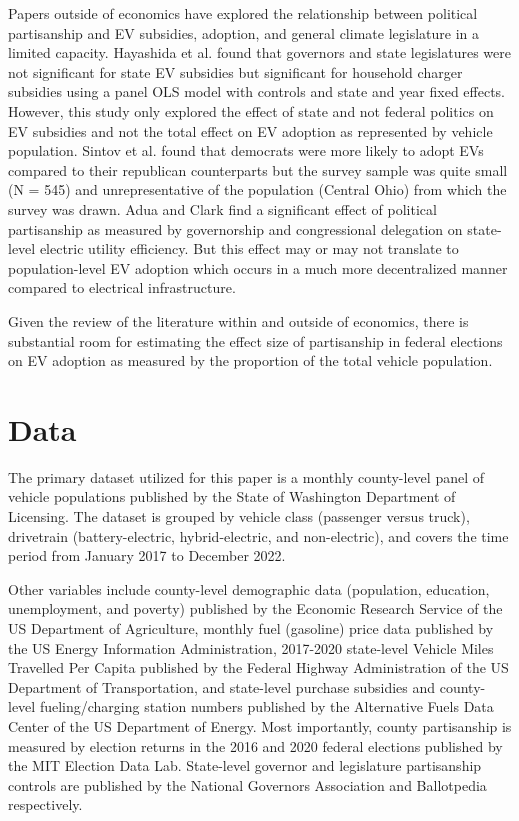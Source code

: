 \documentclass{article}
\begin{document}
Papers outside of economics have explored the relationship between political partisanship and EV subsidies, adoption, and general climate legislature in a limited capacity. Hayashida et al. found that governors and state legislatures were not significant for state EV subsidies but significant for household charger subsidies using a panel OLS model with controls and state and year fixed effects. \autocite{HAYASHIDA2021211} However, this study only explored the effect of state and not federal politics on EV subsidies and not the total effect on EV adoption as represented by vehicle population. Sintov et al. found that democrats were more likely to adopt EVs compared to their republican counterparts but the survey sample was quite small (N = 545) and unrepresentative of the population (Central Ohio) from which the survey was drawn. \autocite{SINTOV2020101576} Adua and Clark find a significant effect of political partisanship as measured by governorship and congressional delegation on state-level electric utility efficiency. \autocite{adua_clark_2020} But this effect may or may not translate to population-level EV adoption which occurs in a much more decentralized manner compared to electrical infrastructure. 

Given the review of the literature within and outside of economics, there is substantial room for estimating the effect size of partisanship in federal elections on EV adoption as measured by the proportion of the total vehicle population. 

\section{Data}

The primary dataset utilized for this paper is a monthly county-level panel of vehicle populations published by the State of Washington Department of Licensing. The dataset is grouped by vehicle class (passenger versus truck), drivetrain (battery-electric, hybrid-electric, and non-electric), and covers the time period from January 2017 to December 2022. 

Other variables include county-level demographic data (population, education, unemployment, and poverty) published by the Economic Research Service of the US Department of Agriculture, monthly fuel (gasoline) price data published by the US Energy Information Administration, 2017-2020 state-level Vehicle Miles Travelled Per Capita published by the Federal Highway Administration of the US Department of Transportation, and state-level purchase subsidies and county-level fueling/charging station numbers published by the Alternative Fuels Data Center of the US Department of Energy. Most importantly, county partisanship is measured by election returns in the 2016 and 2020 federal elections published by the MIT Election Data Lab. State-level governor and legislature partisanship controls are published by the National Governors Association and Ballotpedia respectively. 
\end{document}
